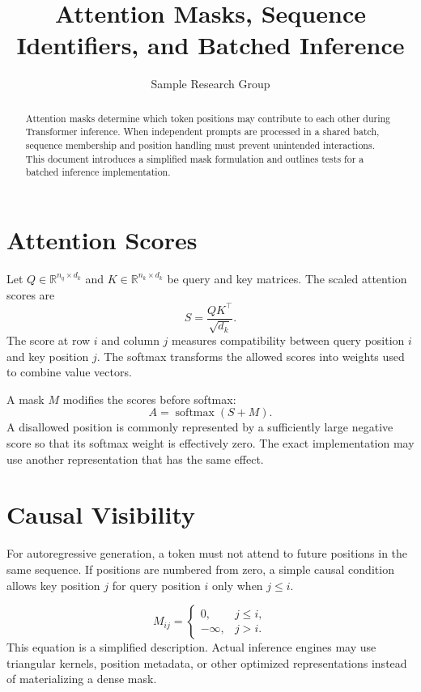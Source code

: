 \documentclass{article}
\title{Attention Masks, Sequence Identifiers, and Batched Inference}
\author{Sample Research Group}
\date{}
\begin{document}
\maketitle

\begin{abstract}
Attention masks determine which token positions may contribute to each other during Transformer inference. When independent prompts are processed in a shared batch, sequence membership and position handling must prevent unintended interactions. This document introduces a simplified mask formulation and outlines tests for a batched inference implementation.
\end{abstract}

\section{Attention Scores}
Let $Q\in\mathbb{R}^{n_q\times d_k}$ and $K\in\mathbb{R}^{n_k\times d_k}$ be query and key matrices. The scaled attention scores are
\begin{equation}
S=\frac{QK^\top}{\sqrt{d_k}}.
\end{equation}
The score at row $i$ and column $j$ measures compatibility between query position $i$ and key position $j$. The softmax transforms the allowed scores into weights used to combine value vectors.

A mask $M$ modifies the scores before softmax:
\begin{equation}
A=\operatorname{softmax}(S+M).
\end{equation}
A disallowed position is commonly represented by a sufficiently large negative score so that its softmax weight is effectively zero. The exact implementation may use another representation that has the same effect.

\section{Causal Visibility}
For autoregressive generation, a token must not attend to future positions in the same sequence. If positions are numbered from zero, a simple causal condition allows key position $j$ for query position $i$ only when $j\leq i$.

\begin{equation}
M_{ij}=
\begin{cases}
0, & j\leq i,\\
-\infty, & j>i.
\end{cases}
\end{equation}
This equation is a simplified description. Actual inference engines may use triangular kernels, position metadata, or other optimized representations instead of materializing a dense mask.
\end{document}
